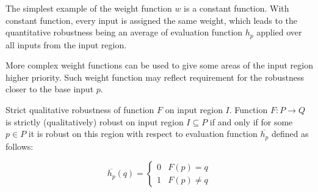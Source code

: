%
%
%


The simplest example of the weight function $w$ is a constant function.
With constant function, every input is assigned the same weight,
which leads to the quantitative robustness being an average
of evaluation function $h_p$ applied over all inputs from the input region.

More complex weight functions can be used to give some areas of the input region
higher priority. Such weight function may reflect requirement for the robustness
closer to the base input $p$.

\begin{definition}{Strict qualitative robustness of function $F$ on input region $I$.}
    Function $F: P\to Q$ is strictly (qualitatively) robust on input region $I\subseteq P$
    if and only if for some $p\in P$ it is robust on this region with respect
    to evaluation function $\overline{h_p}$ defined as follows:

    \begin{equation*}
        \overline{h_p}(q) = \left\{\begin{matrix}
            0 & F(p) = q\\
            1 & F(p) \neq q
        \end{matrix}\right.
    \end{equation*}
\end{definition}

